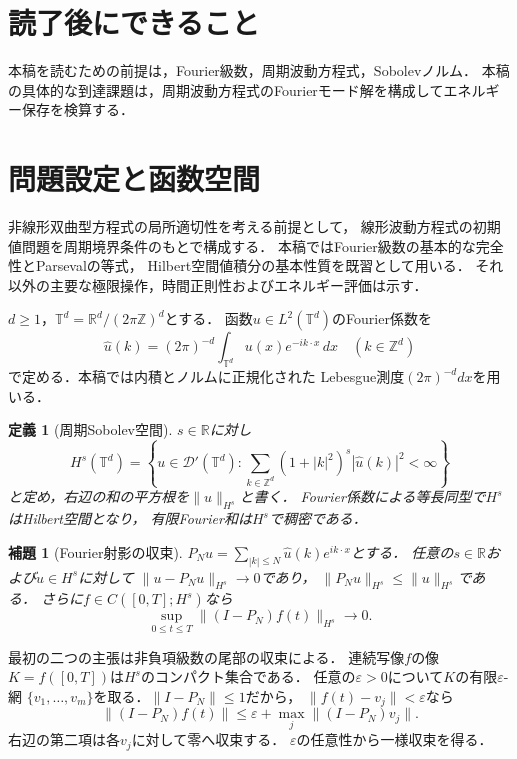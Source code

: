 \documentclass[a5paper,10pt,onecolumn]{jsarticle}
\makeatletter
\theoremstyle{mathnotetheorem}
\newtheorem{definition}[theorem]{定義}
\newtheorem{lemma}[theorem]{補題}
\renewcommand{\proofname}{証明}
\renewenvironment{proof}[1][\proofname]{%
  \par\pushQED{\qed}\normalfont\topsep4\p@\@plus2\p@\relax
  \trivlist\item[\hskip\labelsep\bfseries #1]\ignorespaces
}{\popQED\endtrivlist\@endpefalse}
\makeatother
\begin{document}
\section*{読了後にできること}
本稿を読むための前提は，Fourier級数，周期波動方程式，Sobolevノルム．
本稿の具体的な到達課題は，周期波動方程式のFourierモード解を構成してエネルギー保存を検算する．

\section{問題設定と函数空間}
非線形双曲型方程式の局所適切性を考える前提として，
線形波動方程式の初期値問題を周期境界条件のもとで構成する．
本稿ではFourier級数の基本的な完全性とParsevalの等式，
Hilbert空間値積分の基本性質を既習として用いる．
それ以外の主要な極限操作，時間正則性およびエネルギー評価は示す．

$d\ge1$，$\mathbb T^d=\mathbb R^d/(2\pi\mathbb Z)^d$とする．
函数$u\in L^2(\mathbb T^d)$のFourier係数を
\[
 \widehat u(k)=(2\pi)^{-d}\int_{\mathbb T^d}
                 u(x)e^{-ik\cdot x}\,dx\quad(k\in\mathbb Z^d)
\]
で定める．本稿では内積とノルムに正規化された
Lebesgue測度$(2\pi)^{-d}dx$を用いる．

\begin{definition}[周期Sobolev空間]
$s\in\mathbb R$に対し
\[
 H^s(\mathbb T^d)=\left\{u\in\mathcal D'(\mathbb T^d):
 \sum_{k\in\mathbb Z^d}(1+|k|^2)^s|\widehat u(k)|^2<\infty
 \right\}
\]
と定め，右辺の和の平方根を$\|u\|_{H^s}$と書く．
Fourier係数による等長同型で$H^s$はHilbert空間となり，
有限Fourier和は$H^s$で稠密である．
\end{definition}

\begin{lemma}[Fourier射影の収束]\label{lem:projection}
$P_Nu=\sum_{|k|\le N}\widehat u(k)e^{ik\cdot x}$とする．
任意の$s\in\mathbb R$および$u\in H^s$に対して
$\|u-P_Nu\|_{H^s}\to0$であり，
$\|P_Nu\|_{H^s}\le\|u\|_{H^s}$である．
さらに$f\in C([0,T];H^s)$なら
\[
 \sup_{0\le t\le T}\|(I-P_N)f(t)\|_{H^s}\longrightarrow0.
\]
\end{lemma}
\begin{proof}
最初の二つの主張は非負項級数の尾部の収束による．
連続写像$f$の像$K=f([0,T])$は$H^s$のコンパクト集合である．
任意の$\varepsilon>0$について$K$の有限$\varepsilon$-網
$\{v_1,\ldots,v_m\}$を取る．$\|I-P_N\|\le1$だから，
$\|f(t)-v_j\|<\varepsilon$なら
\[
 \|(I-P_N)f(t)\|
 \le\varepsilon+\max_j\|(I-P_N)v_j\|.
\]
右辺の第二項は各$v_j$に対して零へ収束する．
$\varepsilon$の任意性から一様収束を得る．
\end{proof}
\end{document}
